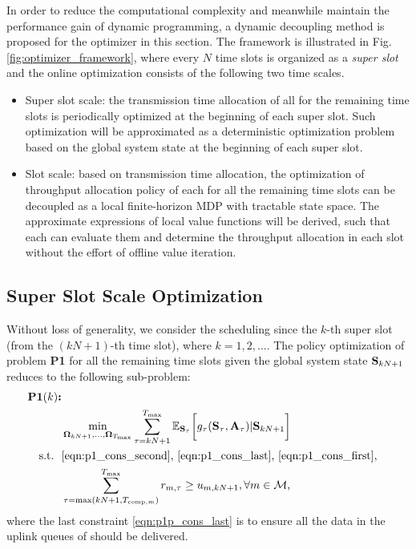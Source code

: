 In order to reduce the computational complexity and meanwhile maintain the performance gain of dynamic programming, a dynamic decoupling method is proposed for the {\fwName} optimizer in this section. The framework is illustrated in Fig. \ref{fig:optimizer_framework}, where every $N$ time slots is organized as a {\it super slot} and the online optimization consists of the following two time scales.
\begin{itemize}
    \item Super slot scale: the transmission time allocation of all {\IAVs} for the remaining time slots is periodically optimized at the beginning of each super slot. Such optimization will be approximated as a deterministic optimization problem based on the global system state at the beginning of each super slot.
    \item Slot scale: based on transmission time allocation, the optimization of throughput allocation policy of each {\IAV} for all the remaining time slots can be decoupled as a local finite-horizon MDP with tractable state space. The approximate expressions of local value functions will be derived, such that each {\IAV} can evaluate them and determine the throughput allocation in each slot without the effort of offline value iteration.
\end{itemize}

\subsection{Super Slot Scale Optimization}
Without loss of generality, we consider the scheduling since the $k$-th super slot (from the $(kN+1)$-th time slot), where $k=1,2,\dots$. The policy optimization of problem {\bf P1} for all the remaining time slots given the global system state $\mathbf{S}_{kN+1}$ reduces to the following sub-problem:
\begin{align}
    \textbf{P1$(k)$:}
    \nonumber\\ 
    &\min_{ \boldsymbol{\Omega}_{kN+1}, \dots, \boldsymbol{\Omega}_{T_{\max}} }
        \sum_{\tau=kN+1}^{{T_{\max}}}  \mathbb{E}_{\mathbf{S}_{\tau}} \bigg[
            g_{\tau}( \mathbf{S}_{\tau}, \mathbf{A}_{\tau} ) | \mathbf{S}_{kN+1}
        \bigg] \nonumber
    \\ \nonumber
    \text{s.t.~~} &\text{\eqref{eqn:p1_cons_second}, \eqref{eqn:p1_cons_last}, \eqref{eqn:p1_cons_first}},
    \\
    & \sum_{ \tau=\max(kN+1,T_{\text{comp},m}) }^{ {T_{\max}} } r_{m,\tau} \geq {u}_{m,kN+1}, \forall m\in\mathcal{M},
    \label{eqn:p1p_cons_last}
\end{align}
where the last constraint \eqref{eqn:p1p_cons_last} is to ensure all the data in the uplink queues of {\IAVs} should be delivered.


